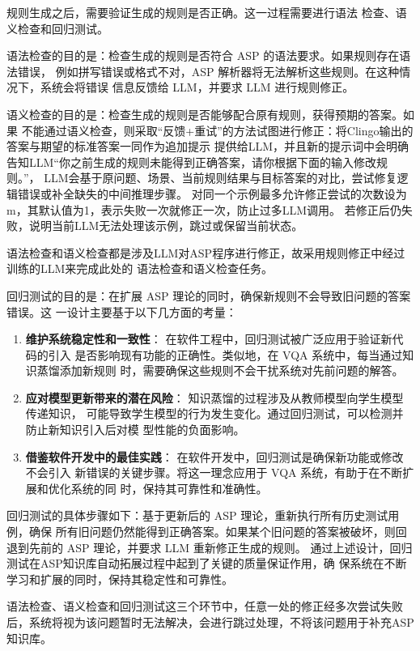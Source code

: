 规则生成之后，需要验证生成的规则是否正确。这一过程需要进行语法
检查、语义检查和回归测试。

语法检查的目的是：检查生成的规则是否符合 ASP 的语法要求。如果规则存在语法错误，
例如拼写错误或格式不对，ASP 解析器将无法解析这些规则。在这种情况下，系统会将错误
信息反馈给 LLM，并要求 LLM 进行规则修正。

语义检查的目的是：检查生成的规则是否能够配合原有规则，获得预期的答案。如果
不能通过语义检查，则采取“反馈+重试”的方法试图进行修正：将Clingo输出的答案与期望的标准答案一同作为追加提示
提供给LLM，并且新的提示词中会明确告知LLM“你之前生成的规则未能得到正确答案，请你根据下面的输入修改规则。”，
LLM会基于原问题、场景、当前规则结果与目标答案的对比，尝试修复逻辑错误或补全缺失的中间推理步骤。
对同一个示例最多允许修正尝试的次数设为m，其默认值为1，表示失败一次就修正一次，防止过多LLM调用。
若修正后仍失败，说明当前LLM无法处理该示例，跳过或保留当前状态。

语法检查和语义检查都是涉及LLM对ASP程序进行修正，故采用规则修正中经过训练的LLM来完成此处的
语法检查和语义检查任务。

回归测试的目的是：在扩展 ASP 理论的同时，确保新规则不会导致旧问题的答案错误。这
一设计主要基于以下几方面的考量：
\begin{enumerate}[nosep]
\item \textbf{维护系统稳定性和一致性}： 在软件工程中，回归测试被广泛应用于验证新代码的引入
是否影响现有功能的正确性。类似地，在 VQA 系统中，每当通过知识蒸馏添加新规则
时，需要确保这些规则不会干扰系统对先前问题的解答。
\item \textbf{应对模型更新带来的潜在风险}： 知识蒸馏的过程涉及从教师模型向学生模型传递知识，
可能导致学生模型的行为发生变化。通过回归测试，可以检测并防止新知识引入后对模
型性能的负面影响。
\item \textbf{借鉴软件开发中的最佳实践}： 在软件开发中，回归测试是确保新功能或修改不会引入
新错误的关键步骤。将这一理念应用于 VQA 系统，有助于在不断扩展和优化系统的同
时，保持其可靠性和准确性。
\end{enumerate}

回归测试的具体步骤如下：基于更新后的 ASP 理论，重新执行所有历史测试用例，确保
所有旧问题仍然能得到正确答案。如果某个旧问题的答案被破坏，则回退到先前的 ASP 理论，并要求 LLM 重新修正生成的规则。
通过上述设计，回归测试在ASP知识库自动拓展过程中起到了关键的质量保证作用，确
保系统在不断学习和扩展的同时，保持其稳定性和可靠性。

语法检查、语义检查和回归测试这三个环节中，任意一处的修正经多次尝试失败后，系统将视为该问题暂时无法解决，会进行跳过处理，不将该问题用于补充ASP知识库。

